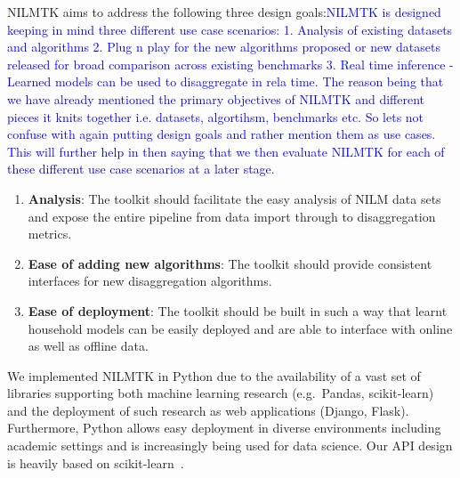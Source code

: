 \documentclass{sig-alternate}
\newcommand{\bluecolor}[1]{\textcolor{blue}{#1}}
\newcommand{\secref}[1]{Section~\ref{#1}}
\begin{document}
\noindent
NILMTK aims to address the following three design goals:\bluecolor{NILMTK is designed keeping in mind three different use case scenarios:
1. Analysis of existing datasets and algorithms
2. Plug n play for the new algorithms proposed or new datasets released for broad comparison across existing benchmarks
3. Real time inference - Learned models can be used to disaggregate in rela time.
The reason being that we have already mentioned the primary objectives of NILMTK and different pieces it knits together i.e. datasets, algortihsm, benchmarks etc. So lets not confuse with again putting design goals and rather mention them as use cases. This will further help in then saying that we then evaluate NILMTK for each of these different use case scenarios at a later stage.}
\begin{enumerate}
\item \textbf{Analysis}: The toolkit should facilitate the easy analysis of NILM data sets and expose the entire pipeline from data import through to disaggregation metrics. 
\item \textbf{Ease of adding new algorithms}: The toolkit should provide consistent interfaces for new disaggregation algorithms.
\item \textbf{Ease of deployment}: The toolkit should be built in such a way that learnt household models can be easily deployed and are able to interface with online as well as offline data.
\end{enumerate}


We implemented NILMTK in Python due to the availability of a vast set of libraries supporting both machine learning research (e.g.\ Pandas, scikit-learn) and the deployment of such research as web applications (Django, Flask). Furthermore, Python allows easy deployment in diverse environments including academic settings and is increasingly being used for data science.
Our API design is heavily based on scikit-learn~\cite{scikit, scikit_api}.
\end{document}
